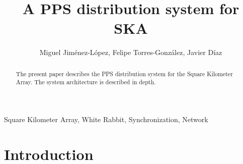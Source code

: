 \documentclass[review]{elsarticle}
\begin{document}
\begin{frontmatter}

\title{A PPS distribution system for SKA}


\author{Miguel Jiménez-López, Felipe Torres-González, Javier Díaz}
\address{CITIC, ETSIIT, University of Granada}





\begin{abstract} 
	The present paper describes the PPS distribution system for the Square Kilometer Array. The system architecture is described in depth. 
\end{abstract}

\begin{keyword}
	Square Kilometer Array, White Rabbit, Synchronization, Network
\end{keyword}

\end{frontmatter}

\linenumbers

\section{Introduction}
\end{document}
